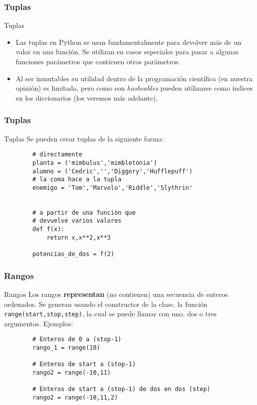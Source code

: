 \documentclass{beamer}
\begin{document}
\begin{frame}[fragile]
    \frametitle{Tuplas}
    \begin{block}{Tuplas}
        \begin{itemize}
        \item Las tuplas en Python se usan fundamentalmente para devolver más de un valor en una función. Se utilizan en casos especiales para pasar a algunas 
    funciones parámetros que contienen otros parámetros. 
        \item Al ser inmutables su utilidad dentro de la programación científica (en nuestra opinión) es limitada, pero como son {\em hasheables}\/ pueden utilizarse
    como índices en los diccionarios (los veremos más adelante).
        \end{itemize}
    \end{block}
\end{frame}

\begin{frame}[fragile]
    \frametitle{Tuplas}
    \begin{block}{Tuplas}
    Se pueden crear tuplas de la siguiente forma:
    \begin{verbatim}
        # directamente
        planta = ('mimbulus','mimbletonia')
        alumno = ('Cedric','','Diggory','Hufflepuff')
        # la coma hace a la tupla
        enemigo = 'Tom','Marvolo','Riddle','Slythrin' 


        # a partir de una función que
        # devuelve varios valores
        def f(x):
            return x,x**2,x**3

        potencias_de_dos = f(2)
    \end{verbatim}
    \end{block}
    \end{frame}

\begin{frame}[fragile]
    \frametitle{Rangos}
    \begin{block}{Rangos}
    Los rangos {\bf representan} (no contienen) una secuencia de enteros ordenados. Se generan usando el constructor de la clase, la función
    \texttt{range(start,stop,step)}, la cual se puede llamar con uno, dos o tres argumentos. Ejemplos:
    \begin{verbatim}
        # Enteros de 0 a (stop-1)
        rango_1 = range(10) 

        # Enteros de start a (stop-1)
        rango2 = range(-10,11)

        # Enteros de start a (stop-1) de dos en dos (step) 
        rango2 = range(-10,11,2)
    \end{verbatim}
    \end{block}
\end{frame}
\end{document}
